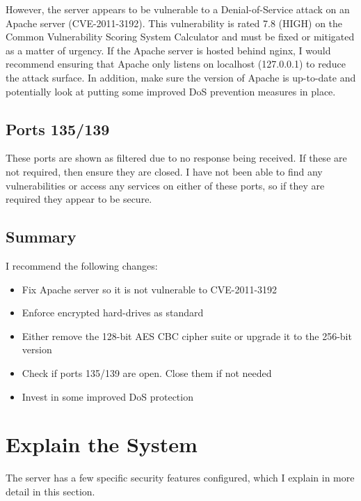 \documentclass[12pt]{article}
\begin{document}
  However, the server appears to be vulnerable to a Denial-of-Service attack on an Apache server (CVE-2011-3192).
  This vulnerability is rated 7.8 (HIGH) on the Common Vulnerability Scoring System Calculator and must be fixed or mitigated as a matter of urgency.
  If the Apache server is hosted behind nginx, I would recommend ensuring that Apache only listens on localhost (127.0.0.1) to reduce the attack surface.
  In addition, make sure the version of Apache is up-to-date and potentially look at putting some improved DoS prevention measures in place.

  \subsection{Ports 135/139}
  These ports are shown as filtered due to no response being received.
  If these are not required, then ensure they are closed.
  I have not been able to find any vulnerabilities or access any services on either of these ports, so if they are required they appear to be secure.

  \subsection{Summary}
  I recommend the following changes:
  \begin{itemize}
    \item Fix Apache server so it is not vulnerable to CVE-2011-3192
    \item Enforce encrypted hard-drives as standard
    \item Either remove the 128-bit AES CBC cipher suite or upgrade it to the 256-bit version
    \item Check if ports 135/139 are open. Close them if not needed
    \item Invest in some improved DoS protection
  \end{itemize}

  \section{Explain the System}

  The server has a few specific security features configured, which I explain in more detail in this section.
\end{document}
